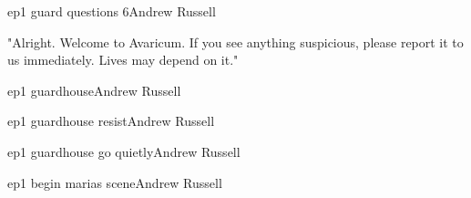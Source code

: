 \documentclass{book}
\begin{document}
\begin{childnode}{ep1 guard questions 6}{Andrew Russell}

    "Alright. Welcome to Avaricum. If you see anything suspicious, please report it to us immediately. Lives may depend on it."


\end{childnode}

\begin{childnode}{ep1 guardhouse}{Andrew Russell}



\end{childnode}

\begin{childnode}{ep1 guardhouse resist}{Andrew Russell}

\end{childnode}

\begin{childnode}{ep1 guardhouse go quietly}{Andrew Russell}

\end{childnode}

\begin{childnode}{ep1 begin marias scene}{Andrew Russell}

\end{childnode}
\end{document}
